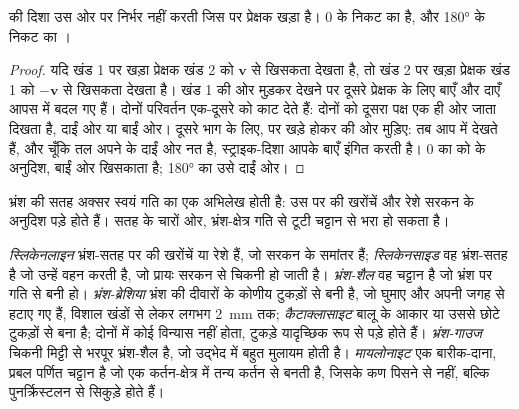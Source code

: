 \begin{proposition}[स्ट्राइक-स्लिप भ्रंश की दिशा]
\label{prop:b1:faults-folds-fabrics:sense}
 की दिशा उस ओर पर निर्भर नहीं करती जिस पर प्रेक्षक खड़ा है। $0$ के निकट का   है, और \ang{180} के निकट का ।
\end{proposition}

\begin{proof}
यदि खंड 1 पर खड़ा प्रेक्षक खंड 2 को $\mathbf v$ से खिसकता देखता है, तो खंड 2 पर खड़ा प्रेक्षक खंड 1 को $-\mathbf v$ से खिसकता देखता है। खंड 1 की ओर मुड़कर देखने पर दूसरे प्रेक्षक के लिए बाएँ और दाएँ आपस में बदल गए हैं। दोनों परिवर्तन एक-दूसरे को काट देते हैं: दोनों को दूसरा पक्ष एक ही ओर जाता दिखता है, दाईं ओर या बाईं ओर। दूसरे भाग के लिए,  पर खड़े होकर  की ओर मुड़िए: तब आप  में देखते हैं, और चूँकि तल अपने  के दाईं ओर नत है, स्ट्राइक-दिशा आपके बाएँ इंगित करती है। $0$ का   को  के अनुदिश, बाईं ओर खिसकाता है; \ang{180} का  उसे दाईं ओर।
\end{proof}

भ्रंश की सतह अक्सर स्वयं गति का एक अभिलेख होती है: उस पर की खरोंचें और रेशे सरकन के अनुदिश पड़े होते हैं। सतह के चारों ओर, भ्रंश-क्षेत्र गति से टूटी चट्टान से भरा हो सकता है।

\begin{definition}[स्लिकेनसाइड, स्लिकेनलाइन, भ्रंश-शैल]
\label{def:b1:faults-folds-fabrics:fault-rocks}
\emph{स्लिकेनलाइन} भ्रंश-सतह पर की खरोंचें या रेशे हैं, जो सरकन के समांतर हैं; \emph{स्लिकेनसाइड} वह भ्रंश-सतह है जो उन्हें वहन करती है, जो प्रायः सरकन से चिकनी हो जाती है। \emph{भ्रंश-शैल} वह चट्टान है जो भ्रंश पर गति से बनी हो। \emph{भ्रंश-ब्रेशिया} भ्रंश की दीवारों के कोणीय टुकड़ों से बनी है, जो घुमाए और अपनी जगह से हटाए गए हैं, विशाल खंडों से लेकर लगभग \qty{2}{mm} तक; \emph{कैटाक्लासाइट} बालू के आकार या उससे छोटे टुकड़ों से बना है; दोनों में कोई विन्यास नहीं होता, टुकड़े यादृच्छिक रूप से पड़े होते हैं। \emph{भ्रंश-गाउज} चिकनी मिट्टी से भरपूर भ्रंश-शैल है, जो उद्भेद में बहुत मुलायम होती है। \emph{मायलोनाइट} एक बारीक-दाना, प्रबल पर्णित चट्टान है जो एक कर्तन-क्षेत्र में तन्य कर्तन से बनती है, जिसके कण पिसने से नहीं, बल्कि पुनर्क्रिस्टलन से सिकुड़े होते हैं।
\end{definition}

